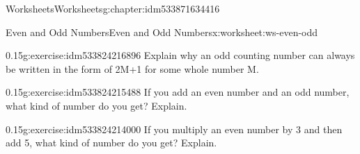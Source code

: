 \documentclass[twoside,11pt,]{book}
\begin{document}
\begin{chapterptx}{Worksheets}{}{Worksheets}{}{}{g:chapter:idm533871634416}
\begin{worksheet-section-numberless}{Even and Odd Numbers}{}{Even and Odd Numbers}{}{}{x:worksheet:ws-even-odd}
\begin{divisionexercise}{2}{}{0.15}{g:exercise:idm533824216896}
Explain why an odd counting number can always be written in the form of 2M+1 for some whole number M.%
\end{divisionexercise}%
\begin{divisionexercise}{3}{}{0.15}{g:exercise:idm533824215488}%
If you add an even number and an odd number, what kind of number do you get? Explain.%
\end{divisionexercise}%
\begin{divisionexercise}{4}{}{0.15}{g:exercise:idm533824214000}%
If you multiply an even number by 3 and then add 5, what kind of number do you get? Explain.%
\end{divisionexercise}%
\end{worksheet-section-numberless}
\restoregeometry
\end{chapterptx}
\end{document}
